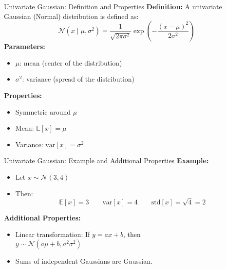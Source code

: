 \documentclass{beamer}
\begin{document}
\begin{frame}{Univariate Gaussian: Definition and Properties}
\textbf{Definition:} A univariate Gaussian (Normal) distribution is defined as:
\[
\mathcal{N}(x \mid \mu, \sigma^2) = \frac{1}{\sqrt{2\pi\sigma^2}} \exp\left( -\frac{(x - \mu)^2}{2\sigma^2} \right)
\]
\textbf{Parameters:}
\begin{itemize}
  \item $\mu$: mean (center of the distribution)
  \item $\sigma^2$: variance (spread of the distribution)
\end{itemize}

\vspace{0.5em}
\textbf{Properties:}
\begin{itemize}
  \item Symmetric around $\mu$
  \item Mean: $\mathbb{E}[x] = \mu$
  \item Variance: $\text{var}[x] = \sigma^2$
\end{itemize}
\end{frame}

\begin{frame}{Univariate Gaussian: Example and Additional Properties}
\textbf{Example:}
\begin{itemize}
  \item Let $x \sim \mathcal{N}(3, 4)$
  \item Then:
    \[
    \mathbb{E}[x] = 3 \qquad \text{var}[x] = 4 \qquad \text{std}[x] = \sqrt{4} = 2
    \]
\end{itemize}

\vspace{0.5em}
\textbf{Additional Properties:}
\begin{itemize}
  \item Linear transformation: If $y = a x + b$, then \\
    $y \sim \mathcal{N}(a\mu + b, a^2\sigma^2)$
  \item Sums of independent Gaussians are Gaussian.
\end{itemize}

\end{frame}
\end{document}
